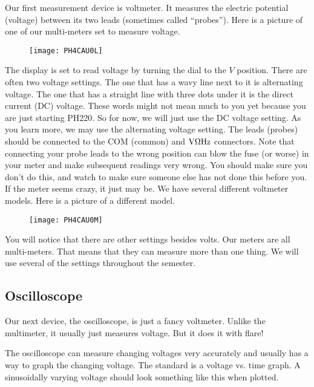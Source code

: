 Our first measurement device is voltmeter. It measures the electric
potential (voltage) between its two leads (sometimes called
\textquotedblleft probes\textquotedblright ). Here is a picture of one of
our multi-meters set to measure voltage.

\begin{figure}[h!]
	\centering
	\texttt{[image: PH4CAU0L]}
\end{figure}

The display is set to read
voltage by turning the dial to the $\unit{V}$ position. There are often two
voltage settings. The one that has a wavy line next to it is alternating
voltage. The one that has a straight line with three dots under it is the
direct current (DC) voltage. These words might not mean much to you yet
because you are just starting PH220. So for now, we will just use the DC
voltage setting. As you learn more, we may use the alternating voltage
setting. The leads (probes) should be connected to the COM (common) and $%
\unit{V}\unit{%
\Omega%
}\unit{Hz}$ connectors. Note that connecting your probe leads to the wrong
position can blow the fuse (or worse) in your meter and make subsequent
readings very wrong. You should make sure you don't do this, and watch to
make sure someone else has not done this before you. If the meter seems
crazy, it just may be. We have several different voltmeter models. Here is a
picture of a different model.

\begin{figure}[h!]
   \centering
   \texttt{[image: PH4CAU0M]}
\end{figure}

You will notice that there are
other settings besides volts. Our meters are all multi-meters. That means
that they can measure more than one thing. We will use several of the
settings throughout the semester.

\subsection{Oscilloscope}

Our next device, the oscilloscope, is just a fancy voltmeter. Unlike the
multimeter, it usually just measures voltage. But it does it with flare!

The oscilloscope can measure changing voltages very accurately and usually
has a way to graph the changing voltage. The standard is a voltage vs. time
graph. A sinusoidally varying voltage should look something like this when
plotted. 

